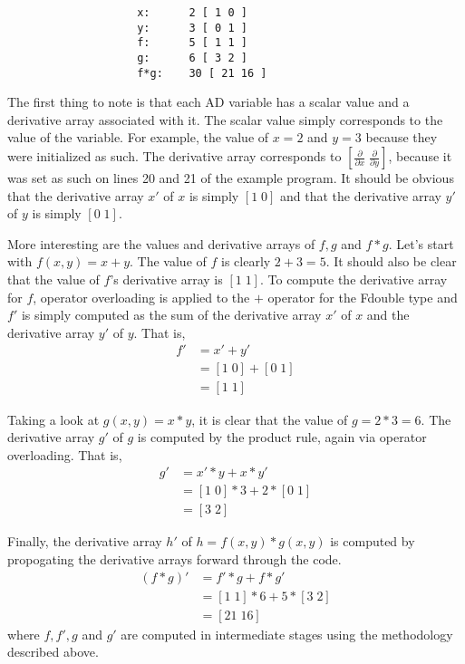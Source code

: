 \documentclass{article}
\begin{document}
\begin{verbatim}
                    x:      2 [ 1 0 ]
                    y:      3 [ 0 1 ]
                    f:      5 [ 1 1 ]
                    g:      6 [ 3 2 ]
                    f*g:    30 [ 21 16 ]
\end{verbatim}

The first thing to note is that each AD variable has a scalar value
and a derivative array associated with it. The scalar value simply corresponds
to the value of the variable. For example, the value of $x=2$ and $y=3$
because they were initialized as such. The derivative array corresponds
to $[ \frac{\partial}{\partial x} \; \frac{\partial}{\partial y} ]$,
because it was set as such on lines 20 and 21 of the example program. It
should be obvious that the derivative array $x'$ of $x$ is simply $[1 \; 0]$
and that the derivative array $y'$ of $y$ is simply $[0 \; 1]$.

More interesting are the values and derivative arrays of $f, g$ and $f*g$.
Let's start with $f(x,y) = x + y$. The value of $f$ is clearly $2+3=5$. It
should also be clear that the value of $f$'s derivative array is $[1 \; 1]$.
To compute the derivative array for $f$, operator overloading is applied to
the $+$ operator for the Fdouble type and $f'$ is simply computed as the
sum of the derivative array $x'$ of $x$ and the derivative array $y'$ of $y$.
That is,
\begin{align*}
f' &= x' + y' \\
&= [1 \; 0] + [0 \; 1] \\
&= [1 \; 1]
\end{align*}

Taking a look at $g(x,y) = x*y$, it is clear that the value of $g = 2*3 = 6$.
The derivative array $g'$ of $g$ is computed by the product rule, again
via operator overloading. That is,
\begin{align*}
g' &= x' * y + x * y' \\
&= [1 \; 0] * 3 + 2 * [0 \; 1] \\
&= [3 \; 2]
\end{align*}

Finally, the derivative array $h'$ of $h = f(x,y) * g(x,y)$ is computed
by propogating the derivative arrays forward through the code.
\begin{align*}
(f * g)' &= f' * g + f * g' \\
&= [1 \; 1] * 6 + 5 * [3 \; 2] \\
&= [21 \; 16]
\end{align*}
where $f,f',g$ and $g'$ are computed in intermediate stages using the
methodology described above.
\end{document}
